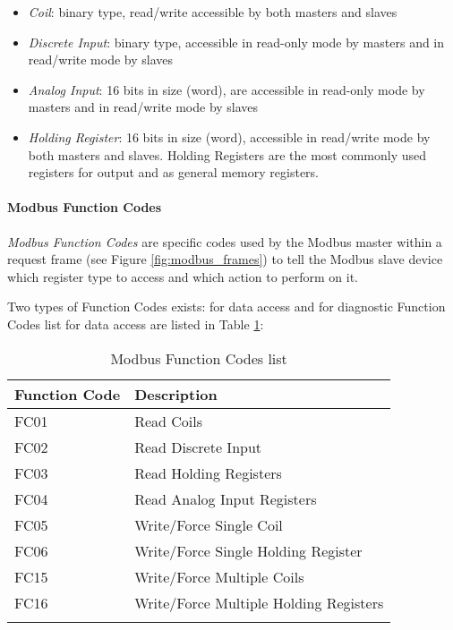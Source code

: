 \begin{itemize}
	\item \textit{Coil}: binary type, read/write accessible by both masters and slaves
	\item \textit{Discrete Input}: binary type, accessible in read-only mode by masters and in read/write mode by slaves
	\item \textit{Analog Input}: 16 bits in size (word), are accessible in read-only mode by masters and in read/write mode by slaves
	\item \textit{Holding Register}:  16 bits in size (word), accessible in read/write mode by both masters and slaves. Holding Registers are the most commonly used registers for output and as general memory registers.
\end{itemize}

\paragraph{Modbus Function Codes}
\label{par:2_modbus_func_codes}
\textit{Modbus Function Codes} are specific codes used by the Modbus master within a request frame (see Figure \ref{fig:modbus_frames}) to tell the Modbus slave device which register type to access and which action to perform on it.

\bigskip
Two types of Function Codes exists: for data access and for diagnostic
Function Codes list for data access are listed in Table \ref{table:modbus_fc_list}:

\bigskip
\begin{longtable}[c]{p{} p{} }
	\hline
	\textbf{Function Code} & \textbf{Description} \\ [0.5ex] 
	\hline
	FC01 & Read Coils \\
	\hline 
	FC02 & Read Discrete Input \\
	\hline
	FC03 & Read Holding Registers \\
	\hline
	FC04 & Read Analog Input Registers \\
	\hline
	FC05 & Write/Force Single Coil \\ 
	\hline
	FC06 & Write/Force Single Holding Register \\ 
	\hline 
	FC15 & Write/Force Multiple Coils \\ 
	\hline
	FC16 & Write/Force Multiple Holding Registers \\ 
	\hline
	
	\caption{Modbus Function Codes list}
	\label{table:modbus_fc_list}
\end{longtable}

